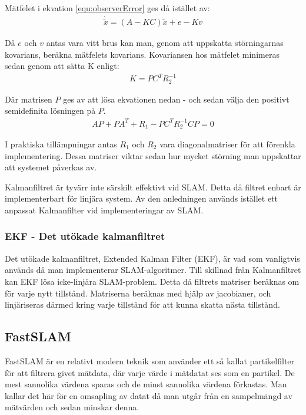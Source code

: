 \documentclass[a4paper,12pt,fleqn]{article}
\begin{document}
Mätfelet i ekvation \ref{equ:observerError} ges då istället av: 
\begin{gather}
\dot{\tilde{x}} = (A - KC)\tilde{x} + e - Kv
\end{gather}

Då $e$ och $v$ antas vara vitt brus kan man, genom att uppskatta störningarnas kovarians, beräkna mätfelets kovarians. Kovariansen hos mätfelet minimeras sedan genom att sätta K enligt: 
\begin{gather}
K = PC^{T}R_{2}^{-1}
\end{gather}

Där matrisen $P$ ges av att lösa ekvationen nedan - och sedan välja den positivt semidefinita lösningen på $P$. 
\begin{gather}
AP + PA^{T} + R_{1} - PC^{T}R_{2}^{-1}CP = 0
\end{gather}

I praktiska tillämpningar antas $R_{1}$ och $R_{2}$ vara diagonalmatriser för att förenkla implementering. Dessa matriser viktar sedan hur mycket störning man uppskattar att systemet påverkas av. 

Kalmanfiltret är tyvärr inte särskilt effektivt vid SLAM. Detta då filtret enbart är implementerbart för linjära system. Av den anledningen används istället ett anpassat Kalmanfilter vid implementeringar av SLAM.  

\subsubsection{EKF - Det utökade kalmanfiltret}

Det utökade kalmanfiltret, Extended Kalman Filter (EKF), är vad som vanligtvis används då man implementerar SLAM-algoritmer. Till skillnad från Kalmanfiltret kan EKF lösa icke-linjära SLAM-problem. Detta då filtrets matriser beräknas om för varje nytt tillstånd. Matriserna beräknas med hjälp av jacobianer, och linjäriseras därmed kring varje tillstånd för att kunna skatta nästa tillstånd. 


\subsection{FastSLAM}
FastSLAM är en relativt modern teknik som använder ett så kallat partikelfilter för att filtrera givet mätdata, där varje värde i mätdatat ses som en partikel. De mest sannolika värdena sparas och de minst sannolika värdena förkastas. Man kallar det här för en omsapling av datat då man utgår från en sampelmängd av mätvärden och sedan minskar denna. 
\end{document}
